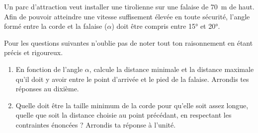 %
%
    Un parc d'attraction veut installer une tirolienne sur une falaise de \SI{70}{m} de haut.
    Afin de pouvoir atteindre une vitesse suffisement élevée en toute sécurité, l'angle formé entre la corde et la falaise ($\alpha$) doit être compris entre \ang{15} et \ang{20}.
    \begin{center}
        
    \end{center}
    Pour les questions suivantes n'oublie pas de  noter tout ton raisonnement en étant précis et rigoureux.
    \begin{enumerate}
        \item En fonction de l'angle $\alpha$, calcule la distance minimale et la distance maximale qu'il doit y avoir entre le point d'arrivée et le pied de la falaise. Arrondis tes réponses au dixième.
        \item Quelle doit être la taille minimum de la corde pour qu'elle soit assez longue, quelle que soit la distance choisie au point précédant, en respectant les contraintes énoncées ? Arrondis ta réponse à l'unité.
    \end{enumerate}
